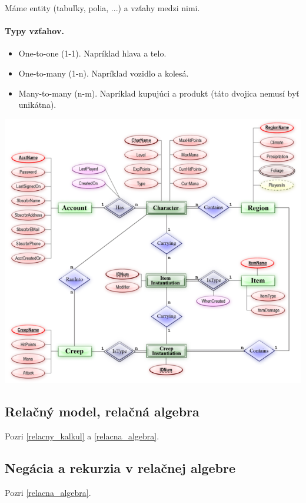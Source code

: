 \documentclass[10pt,a4paper]{article}
\begin{document}
Máme entity (tabuľky, polia, ...) a vzťahy medzi nimi. 
\paragraph{Typy vzťahov.}
\begin{itemize}
\item One-to-one (1-1). Napríklad hlava a telo. 
\item One-to-many (1-n). Napríklad vozidlo a kolesá. 
\item Many-to-many (n-m). Napríklad kupujúci a produkt (táto dvojica nemusí byť unikátna).
\end{itemize}

\begin{center}
\includegraphics[scale=0.5]{db_entity_relationship.png}
\end{center} 

\subsection{Relačný model, relačná algebra}
Pozri \ref{relacny_kalkul} a \ref{relacna_algebra}. 

\subsection{Negácia a rekurzia v relačnej algebre}
Pozri \ref{relacna_algebra}. 
\end{document}
